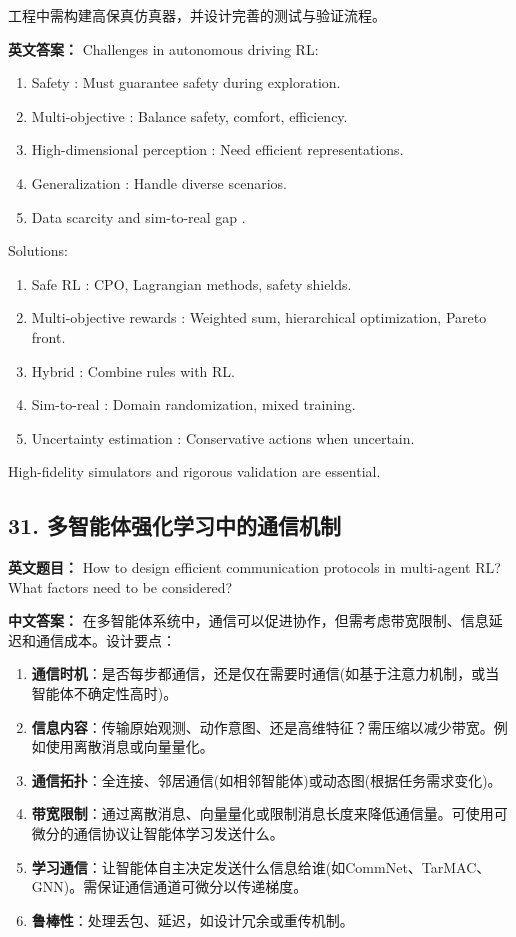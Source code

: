 \documentclass[10pt,a4paper]{ctexart}
\begin{document}
工程中需构建高保真仿真器，并设计完善的测试与验证流程。

\textbf{英文答案：}  
Challenges in autonomous driving RL:
\begin{enumerate}
    \item Safety : Must guarantee safety during exploration.
    \item Multi-objective : Balance safety, comfort, efficiency.
    \item High-dimensional perception : Need efficient representations.
    \item Generalization : Handle diverse scenarios.
    \item Data scarcity and sim-to-real gap .
\end{enumerate}

Solutions:
\begin{enumerate}
    \item Safe RL : CPO, Lagrangian methods, safety shields.
    \item Multi-objective rewards : Weighted sum, hierarchical optimization, Pareto front.
    \item Hybrid : Combine rules with RL.
    \item Sim-to-real : Domain randomization, mixed training.
    \item Uncertainty estimation : Conservative actions when uncertain.
\end{enumerate}

High-fidelity simulators and rigorous validation are essential.

\subsection*{31. 多智能体强化学习中的通信机制}
\textbf{英文题目：} How to design efficient communication protocols in multi-agent RL? What factors need to be considered?

\textbf{中文答案：}  
在多智能体系统中，通信可以促进协作，但需考虑带宽限制、信息延迟和通信成本。设计要点：

\begin{enumerate}
    \item \textbf{通信时机}：是否每步都通信，还是仅在需要时通信(如基于注意力机制，或当智能体不确定性高时)。
    \item \textbf{信息内容}：传输原始观测、动作意图、还是高维特征？需压缩以减少带宽。例如使用离散消息或向量量化。
    \item \textbf{通信拓扑}：全连接、邻居通信(如相邻智能体)或动态图(根据任务需求变化)。
    \item \textbf{带宽限制}：通过离散消息、向量量化或限制消息长度来降低通信量。可使用可微分的通信协议让智能体学习发送什么。
    \item \textbf{学习通信}：让智能体自主决定发送什么信息给谁(如CommNet、TarMAC、GNN)。需保证通信通道可微分以传递梯度。
    \item \textbf{鲁棒性}：处理丢包、延迟，如设计冗余或重传机制。
\end{enumerate}
\end{document}
